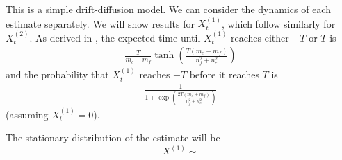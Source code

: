 \documentclass{article}
\begin{document}
This is a simple drift-diffusion model.  We can consider the dynamics of each estimate separately.  We will show results for $X_t^{(1)}$, which follow similarly for $X_t^{(2)}$.  As derived in \cite{Bogacz:2006uq}, the expected time until $X_t^{(1)}$ reaches either $-T$ or $T$ is 
\begin{align*}
\frac{T}{m_e+m_f}\tanh\left(\frac{T(m_e+m_f)}{n_f^2+n_e^2}\right)
\end{align*}
and the probability that $X_t^{(1)}$ reaches $-T$ before it reaches $T$ is
\begin{align*}
\frac{1}{1+\exp\left(\frac{2T(m_e+m_f)}{n_f^2+n_e^2}\right)}
\end{align*}
(assuming $X_t^{(1)}=0$).

The stationary distribution of the estimate will be 
\begin{equation}
X^{(1)}\sim  \label{ddm_stat}
\end{equation} 
\end{document}
